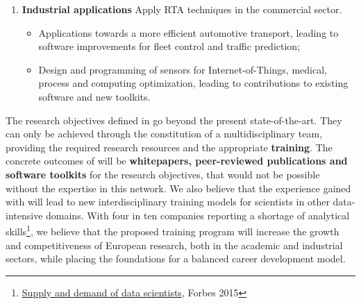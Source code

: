 \begin{enumerate}
\item\textbf{Industrial applications} Apply RTA techniques in the commercial sector.
\begin{itemize}
\item Applications towards a more efficient automotive transport, leading to software improvements for fleet control and traffic prediction;
\item Design and programming of sensors for Internet-of-Things, medical, process and computing optimization, leading to contributions to existing software and new toolkits. 
\end{itemize}

\end{enumerate} 


The research objectives defined in \acronym go beyond the present state-of-the-art. 
They can only be achieved through the constitution of a multidisciplinary team, providing the required research resources and the appropriate \textbf{training}. 
The concrete outcomes of \acronym will be \textbf{whitepapers, peer-reviewed publications and software toolkits} for the research objectives, that would not be possible without the expertise in this network. 
We also believe that the experience gained with \acronym will lead to new interdisciplinary training models for scientists in other data-intensive domains.
With four in ten companies reporting a shortage of analytical skills\footnote{\href{http://www.forbes.com/sites/gilpress/2015/04/30/the-supply-and-demand-of-data-scientists-what-the-surveys-say/}{Supply and demand of data scientists}, Forbes 2015}, we believe that the proposed training program will increase the growth and competitiveness of European research, both in the academic and industrial sectors, while placing the foundations for a balanced career development model.


